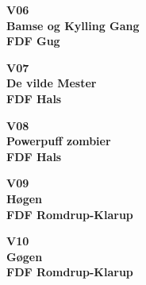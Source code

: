 \newpage

\vspace*{2cm}
\begin{center}
{\fontsize{300}{60}\selectfont\textbf{\textcolor{søblå}{V06}}\\}
{\fontsize{30}{50}\selectfont\textbf{\textcolor{søblå}{Bamse og Kylling Gang}}\\}
{\fontsize{20}{50}\selectfont\textbf{FDF Gug}\\}
\end{center}
\newpage

\vspace*{2cm}
\begin{center}
{\fontsize{300}{60}\selectfont\textbf{\textcolor{søblå}{V07}}\\}
{\fontsize{30}{50}\selectfont\textbf{\textcolor{søblå}{De vilde Mester}}\\}
{\fontsize{20}{50}\selectfont\textbf{FDF Hals}\\}
\end{center}
\newpage

\vspace*{2cm}
\begin{center}
{\fontsize{300}{60}\selectfont\textbf{\textcolor{søblå}{V08}}\\}
{\fontsize{30}{50}\selectfont\textbf{\textcolor{søblå}{Powerpuff zombier}}\\}
{\fontsize{20}{50}\selectfont\textbf{FDF Hals}\\}
\end{center}
\newpage

\vspace*{2cm}
\begin{center}
{\fontsize{300}{60}\selectfont\textbf{\textcolor{søblå}{V09}}\\}
{\fontsize{30}{50}\selectfont\textbf{\textcolor{søblå}{Høgen}}\\}
{\fontsize{20}{50}\selectfont\textbf{FDF Romdrup-Klarup}\\}
\end{center}
\newpage

\vspace*{2cm}
\begin{center}
{\fontsize{300}{60}\selectfont\textbf{\textcolor{søblå}{V10}}\\}
{\fontsize{30}{50}\selectfont\textbf{\textcolor{søblå}{Gøgen}}\\}
{\fontsize{20}{50}\selectfont\textbf{FDF Romdrup-Klarup}\\}
\end{center}
\newpage


